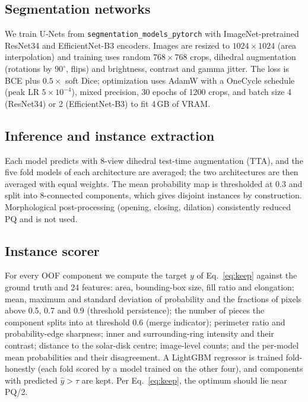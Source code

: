 \documentclass[sigconf]{acmart}
\begin{document}
\subsection{Segmentation networks}
    We train U-Nets \cite{ronneberger2015unet} from \texttt{segmentation\_models\_pytorch} \cite{iakubovskii2019smp} with ImageNet-pretrained ResNet34 \cite{he2016resnet} and EfficientNet-B3 \cite{tan2019efficientnet} encoders. Images are resized to $1024\times1024$ (area interpolation) and training uses random $768\times768$ crops, dihedral augmentation (rotations by $90^\circ$, flips) and brightness, contrast and gamma jitter. The loss is BCE plus $0.5\times$ soft Dice; optimization uses AdamW with a OneCycle schedule (peak LR $5\times10^{-4}$), mixed precision, 30 epochs of 1200 crops, and batch size 4 (ResNet34) or 2 (EfficientNet-B3) to fit 4\,GB of VRAM.

\subsection{Inference and instance extraction}
    Each model predicts with 8-view dihedral test-time augmentation (TTA), and the five fold models of each architecture are averaged; the two architectures are then averaged with equal weights. The mean probability map is thresholded at 0.3 and split into 8-connected components, which gives disjoint instances by construction. Morphological post-processing (opening, closing, dilation) consistently reduced PQ and is not used.

\subsection{Instance scorer}
    For every OOF component we compute the target $y$ of Eq.~\eqref{eq:keep} against the ground truth and 24 features: area, bounding-box size, fill ratio and elongation; mean, maximum and standard deviation of probability and the fractions of pixels above 0.5, 0.7 and 0.9 (threshold persistence); the number of pieces the component splits into at threshold 0.6 (merge indicator); perimeter ratio and probability-edge sharpness; inner and surrounding-ring intensity and their contrast; distance to the solar-disk centre; image-level counts; and the per-model mean probabilities and their disagreement. A LightGBM regressor \cite{ke2017lightgbm} is trained fold-honestly (each fold scored by a model trained on the other four), and components with predicted $\hat y>\tau$ are kept. Per Eq.~\eqref{eq:keep}, the optimum should lie near PQ/2.
\end{document}
